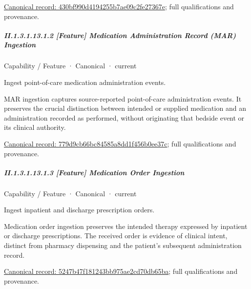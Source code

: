 {\footnotesize \href{../../../../continuum/strategy/capability/feature/430bf990d4194255b7ae09c2fe27367e.md}{Canonical record: 430bf990d4194255b7ae09c2fe27367e}; full qualifications and provenance.}\par
\subparagraph*{II.1.3.1.13.1.2 [Feature] Medication Administration Record (MAR) Ingestion}
\label{navigation:II.1.3.1.13.1.2}

\label{element:779d9cb66bc84585a8dd1f456b0ee37c}
{\small Capability / Feature · Canonical · current}\par

Ingest point-of-care medication administration events.



MAR ingestion captures source-reported point-of-care administration events. It preserves the crucial distinction between intended or supplied medication and an administration recorded as performed, without originating that bedside event or its clinical authority.


{\footnotesize \href{../../../../continuum/strategy/capability/feature/779d9cb66bc84585a8dd1f456b0ee37c.md}{Canonical record: 779d9cb66bc84585a8dd1f456b0ee37c}; full qualifications and provenance.}\par
\subparagraph*{II.1.3.1.13.1.3 [Feature] Medication Order Ingestion}
\label{navigation:II.1.3.1.13.1.3}

\label{element:5247b47f181243bb975ae2cd70db65ba}
{\small Capability / Feature · Canonical · current}\par

Ingest inpatient and discharge prescription orders.



Medication order ingestion preserves the intended therapy expressed by inpatient or discharge prescriptions. The received order is evidence of clinical intent, distinct from pharmacy dispensing and the patient's subsequent administration record.


{\footnotesize \href{../../../../continuum/strategy/capability/feature/5247b47f181243bb975ae2cd70db65ba.md}{Canonical record: 5247b47f181243bb975ae2cd70db65ba}; full qualifications and provenance.}\par
